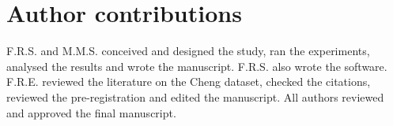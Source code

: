 \documentclass[11pt,a4paper]{article}
\begin{document}
\section*{Author contributions}
F.R.S. and M.M.S. conceived and designed the study, ran the experiments, analysed the results and wrote the manuscript. F.R.S. also wrote the software. F.R.E. reviewed the literature on the Cheng dataset, checked the citations, reviewed the pre-registration and edited the manuscript. All authors reviewed and approved the final manuscript.



\end{document}
